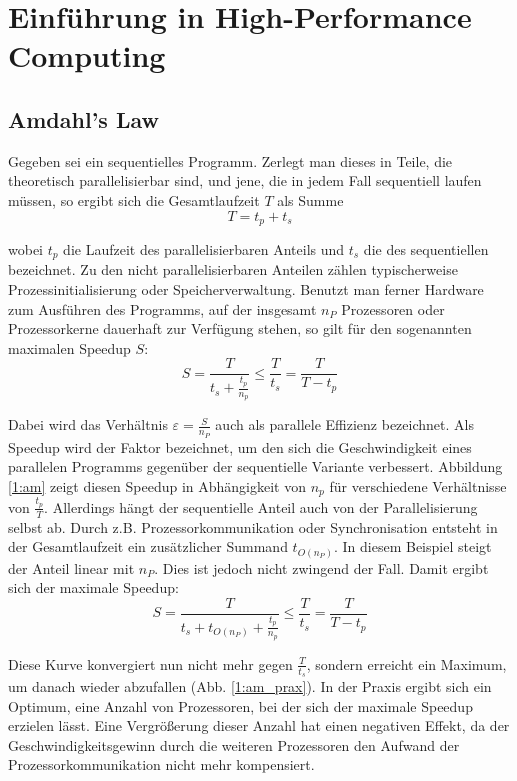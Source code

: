 	\chapter{Einf\"uhrung in High-Performance Computing} 
		\section{Amdahl's Law}
		Gegeben sei ein sequentielles Programm. Zerlegt man dieses in Teile, die theoretisch parallelisierbar sind, und jene, die in jedem Fall sequentiell laufen müssen, so ergibt sich die Gesamtlaufzeit $T$ als Summe 
		\begin{equation}\label{eq1:am}
		    T = t_p + t_s
        	\end{equation}
        	
        	wobei $t_p$ die Laufzeit des parallelisierbaren Anteils und $t_s$ die des sequentiellen bezeichnet. Zu den nicht parallelisierbaren Anteilen zählen typischerweise Prozessinitialisierung oder Speicherverwaltung. Benutzt man ferner Hardware zum Ausführen des Programms, auf der insgesamt $n_P$ Prozessoren oder Prozessorkerne dauerhaft zur Verfügung stehen, so gilt für den sogenannten maximalen Speedup $S$:
		\begin{equation}
		    S = \frac{T}{t_s + \frac{t_p}{n_p}} \leq \frac{T}{t_s} = \frac{T}{T-t_p}
        	\end{equation}	   
		
		Dabei wird das Verhältnis $\varepsilon = \frac{S}{n_P}$ auch als \gls{parallele Effizienz} bezeichnet. Als \Gls{Speedup} wird der Faktor bezeichnet, um den sich die Geschwindigkeit eines parallelen Programms gegenüber der sequentielle Variante verbessert. Abbildung \ref{1:am} zeigt diesen Speedup in Abhängigkeit von $n_p$ für verschiedene Verhältnisse von $\frac{t_p}{T}$.
		Allerdings hängt der sequentielle Anteil auch von der Parallelisierung selbst ab. Durch z.B. Prozessorkommunikation oder Synchronisation entsteht in der Gesamtlaufzeit ein zusätzlicher Summand	$t_{O(n_P)}$. In diesem Beispiel steigt der Anteil linear mit $n_P$. Dies ist jedoch nicht zwingend der Fall. Damit ergibt sich der maximale \Gls{Speedup}:		
		\begin{equation}
		    S = \frac{T}{t_s + t_{O(n_P)} + \frac{t_p}{n_p}} \leq \frac{T}{t_s} = \frac{T}{T-t_p}		
		\end{equation}
		
		Diese Kurve konvergiert nun nicht mehr gegen $\frac{T}{t_s}$, sondern erreicht ein Maximum, um danach wieder abzufallen (Abb. \ref{1:am_prax}). In der Praxis ergibt sich ein Optimum, eine Anzahl von Prozessoren, bei der sich der maximale \Gls{Speedup} erzielen lässt. Eine Vergrößerung dieser Anzahl hat einen negativen Effekt, da der Geschwindigkeitsgewinn durch die weiteren Prozessoren den Aufwand der Prozessorkommunikation nicht mehr kompensiert.
		
